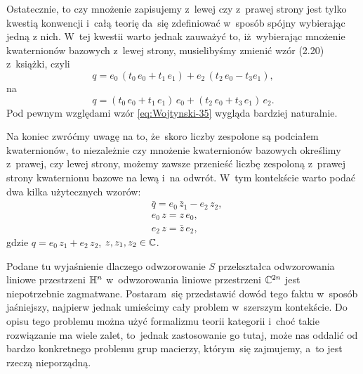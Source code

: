 \documentclass[a4paper,11pt]{article}
\begin{document}
Ostatecznie, to czy mnożenie zapisujemy z~lewej czy z~prawej strony jest
tylko kwestią konwencji i~całą teorię da~się zdefiniować w~sposób spójny
wybierając jedną z nich. W~tej kwestii warto jednak zauważyć to,
iż~wybierając mnożenie kwaternionów bazowych z~lewej strony, musielibyśmy
zmienić wzór (2.20) z~książki, czyli
\begin{equation}
  \label{eq:Wojtynski-35}
  q =
  e_{ 0 } \, ( t_{ 0 } \, e_{ 0 } + t_{ 1 } \, e_{ 1 } )
  + e_{ 2 } \, ( t_{ 2 } \, e_{ 0 } - t_{ 3 } e_{ 1 } ),
\end{equation}
na
\begin{equation}
  \label{eq:Wojtynski-36}
  q =
  ( t_{ 0 } \, e_{ 0 } + t_{ 1 } \, e_{ 1 } ) \, e_{ 0 }
  + ( t_{ 2 } \, e_{ 0 } + t_{ 3 } \, e_{ 1 } ) \, e_{ 2 }.
\end{equation}
Pod pewnym względami wzór \eqref{eq:Wojtynski-35} wygląda bardziej
naturalnie.

Na koniec zwróćmy uwagę na to, że~skoro liczby zespolone są podciałem
kwaternionów, to niezależnie czy mnożenie kwaternionów bazowych określimy
z~prawej, czy lewej strony, możemy zawsze przenieść liczbę zespoloną
z~prawej strony kwaternionu bazowe na lewą i~na odwrót. W~tym kontekście
warto podać dwa kilka użytecznych wzorów:
\begin{subequations}
  \begin{align}
    \label{eq:Wojtynski-37-A}
    &\bar{q} = e_{ 0 } \, \bar{z}_{ 1 } - e_{ 2 } \, z_{ 2 }, \\
    \label{eq:Wojtynski-37-B}
    &e_{ 0 } \, z = z \, e_{ 0 }, \\
    \label{eq:Wojtynski-37-C}
    &e_{ 2 } \, z = \bar{z} \, e_{ 2 },
  \end{align}
\end{subequations}
gdzie $q = e_{ 0 } \, z_{ 1 } + e_{ 2 } \, z_{ 2 }$, $z, z_{ 1 }, z_{ 2 } \in \mathbb{C}$.

\vspace{\spaceFour}





 Podane tu wyjaśnienie dlaczego odwzorowanie $S$ przekształca
odwzorowania liniowe przestrzeni $\mathbb{H}^{ n }$ w~odwzorowania liniowe
przestrzeni $\mathbb{C}^{ 2n }$ jest niepotrzebnie zagmatwane. Postaram~się
przedstawić dowód tego faktu w~sposób jaśniejszy, najpierw jednak
umieścimy cały problem w~szerszym kontekście. Do opisu tego problemu
można użyć formalizmu teorii kategorii i~choć takie rozwiązanie ma wiele
zalet, to~jednak zastosowanie go tutaj, może nas oddalić od bardzo
konkretnego problemu grup macierzy, którym~się zajmujemy, a~to jest rzeczą
nieporządną.
\end{document}

